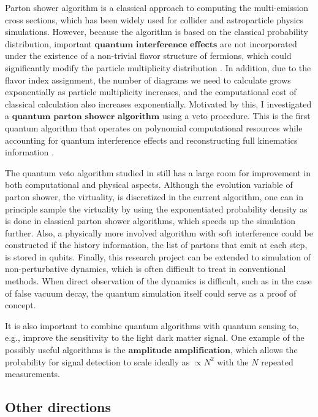 \documentclass[12pt]{article}
\begin{document}
Parton shower algorithm is a classical approach to computing the multi-emission cross sections, which has been widely used for collider and astroparticle physics simulations.
However, because the algorithm is based on the classical probability distribution, important $\textbf{quantum interference effects}$ are not incorporated under the existence of a non-trivial flavor structure of fermions, which could significantly modify the particle multiplicity distribution \cite{Chigusa:2022act}.
In addition, due to the flavor index assignment, the number of diagrams we need to calculate grows exponentially as particle multiplicity increases, and the computational cost of classical calculation also increases exponentially.
Motivated by this, I investigated a $\textbf{quantum parton shower algorithm}$ using a veto procedure.
This is the first quantum algorithm that operates on polynomial computational resources while accounting for quantum interference effects and reconstructing full kinematics information \cite{Bauer:2023ujy}.

The quantum veto algorithm studied in \cite{Bauer:2023ujy} still has a large room for improvement in both computational and physical aspects.
Although the evolution variable of parton shower, the virtuality, is discretized in the current algorithm, one can in principle sample the virtuality by using the exponentiated probability density as is done in classical parton shower algorithms, which speeds up the simulation further.
Also, a physically more involved algorithm with soft interference could be constructed if the history information, the list of partons that emit at each step, is stored in qubits.
Finally, this research project can be extended to simulation of non-perturbative dynamics, which is often difficult to treat in conventional methods.
When direct observation of the dynamics is difficult, such as in the case of false vacuum decay, the quantum simulation itself could serve as a proof of concept.

It is also important to combine quantum algorithms with quantum sensing to, e.g., improve the sensitivity to the light dark matter signal.
One example of the possibly useful algorithms is the $\textbf{amplitude amplification}$, which allows the probability for signal detection to scale ideally as $\propto N^2$ with the $N$ repeated measurements.

\subsection*{Other directions}
\end{document}
